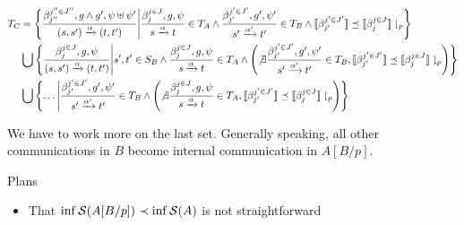 \begin{frame}
  \begin{align*}
    T_C & = \left\{\dfrac{\beta_{j''}^{j''\in J''}, g\wedge g', \psi\uplus\psi'}{(s,s')\xrightarrow{\alpha} (t,t')}\Bigg|\dfrac{\beta_{j}^{j\in J}, g, \psi}{s\xrightarrow{\alpha} t}\in T_A\wedge \dfrac{\beta_{j'}^{j'\in J'}, g', \psi'}{s'\xrightarrow{\alpha'} t'}\in T_B\wedge \llbracket \beta_{j'}^{j'\in J'}\rrbracket \preceq \llbracket \beta_{j}^{j\in J}\rrbracket\downharpoonright_p \right\}                   \\
        & \bigcup \left\{\dfrac{\beta_{j}^{j\in J}, g, \psi}{(s,s')\xrightarrow{\alpha} (t,t')}\Bigg|s',t'\in S_B\wedge\dfrac{\beta_{j}^{j\in J}, g, \psi}{s\xrightarrow{\alpha} t}\in T_A \wedge \left(\not\exists\dfrac{\beta_{j'}^{j'\in J'}, g', \psi'}{s'\xrightarrow{\alpha'} t'}\in T_B, \llbracket \beta_{j'}^{j'\in J'}\rrbracket \preceq \llbracket \beta_{j}^{j\in J}\rrbracket\downharpoonright_p\right) \right\} \\
        & \bigcup \left\{\ldots\Bigg|\dfrac{\beta_{j'}^{j'\in J'}, g', \psi'}{s'\xrightarrow{\alpha'} t'}\in T_B\wedge \left(\not\exists \dfrac{\beta_{j}^{j\in J}, g, \psi}{s\xrightarrow{\alpha} t}\in T_A, \llbracket \beta_{j'}^{j'\in J'}\rrbracket \preceq \llbracket \beta_{j}^{j\in J}\rrbracket\downharpoonright_p\right) \right\}
  \end{align*}

  We have to work more on the last set. Generally speaking, all other communications in $B$ become internal communication in $A[B/p]$.
\end{frame}

\begin{frame}{Plans}
  \begin{itemize}
    \item That $\inf \S(A[B/p]) \prec \inf \S(A)$ is not straightforward
  \end{itemize}
\end{frame}